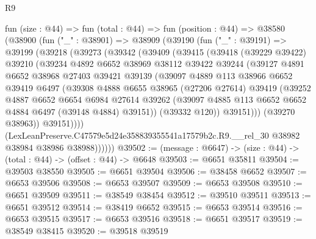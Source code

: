 \begin{lexlean}{R9}
\begin{coremodule}
  fun (size : @44) =>
  fun (total : @44) =>
  fun (position : @44) =>
  @38580
    (@38900
      (fun ("_" : @38901) =>
      @38909
        (@39190
          (fun ("_" : @39191) =>
          @39199
            (@39218
              (@39273
                (@39342
                  (@39409
                    (@39415
                      (@39418
                        (@39229 @39422)
                        @39210
                        (@39234
                          @4892
                          @6652
                          @38969
                          @38112
                          @39422
                          @39244
                          (@39127
                            @4891
                            @6652
                            @38968
                            @27403
                            @39421
                            @39139
                            (@39097
                              @4889
                              @113
                              @38966
                              @6652
                              @39419
                              @6497
                              (@39308
                                @4888
                                @6655
                                @38965
                                (@27206 @27614)
                                @39419
                                (@39252
                                  @4887
                                  @6652
                                  @6654
                                  @6984
                                  @27614
                                  @39262
                                  (@39097 @4885 @113 @6652 @6652 @4884 @6497 (@39148 @4884) @39151))
                                (@39332 @120))
                              @39151)))
                        (@39270 @38963))
                      @39151))))
              (LexLeanPreserve.C47579e5d24e358839355541a17579b2c.R9.__rel_30
                @38982
                @38984
                @38986
                @38988))))))
@39502 := (message : @6647) -> (size : @44) -> (total : @44) -> (offset : @44) -> @6648
@39503 := @6651 @35811
@39504 := @39503 @38550
@39505 := @6651 @39504
@39506 := @38458 @6652
@39507 := @6653 @39506
@39508 := @6653 @39507
@39509 := @6653 @39508
@39510 := @6651 @39509
@39511 := @38549 @38454
@39512 := @39510 @39511
@39513 := @6651 @39512
@39514 := @38419 @6652
@39515 := @6653 @39514
@39516 := @6653 @39515
@39517 := @6653 @39516
@39518 := @6651 @39517
@39519 := @38549 @38415
@39520 := @39518 @39519

\end{coremodule}
\end{lexlean}
